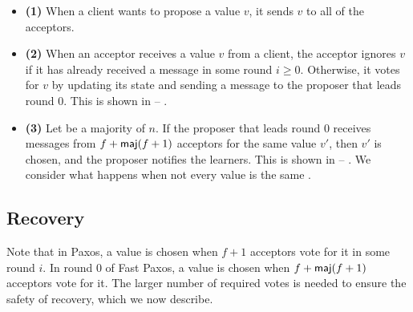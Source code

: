 \begin{itemize}
  \item \textbf{(1)}
    When a client wants to propose a value $v$, it sends $v$ to all of the
    acceptors.

  \item \textbf{(2)}
    When an acceptor receives a value $v$ from a client, the acceptor ignores
    $v$ if it has already received a message in some round $i \geq 0$.
    Otherwise, it votes for $v$ by updating its state and sending a
     message to the proposer that leads round $0$. This is
    shown in   --
    .

  \item \textbf{(3)}
    Let  be a majority of $n$.
    If the proposer that leads round $0$ receives  messages
    from $f + \textsf{maj}(f+1)$ acceptors for the same value $v'$, then $v'$ is
    chosen, and the proposer notifies the learners. This is shown in
      -- . We
    consider what happens when not every value is the same .
\end{itemize}

%
\subsection{Recovery}
Note that in Paxos, a value is chosen when $f+1$ acceptors vote for it in some
round $i$. In round $0$ of Fast Paxos, a value is chosen when $f + \textsf{maj}(f+1)$
acceptors vote for it. The larger number of required votes is needed to ensure
the safety of recovery, which we now describe.

